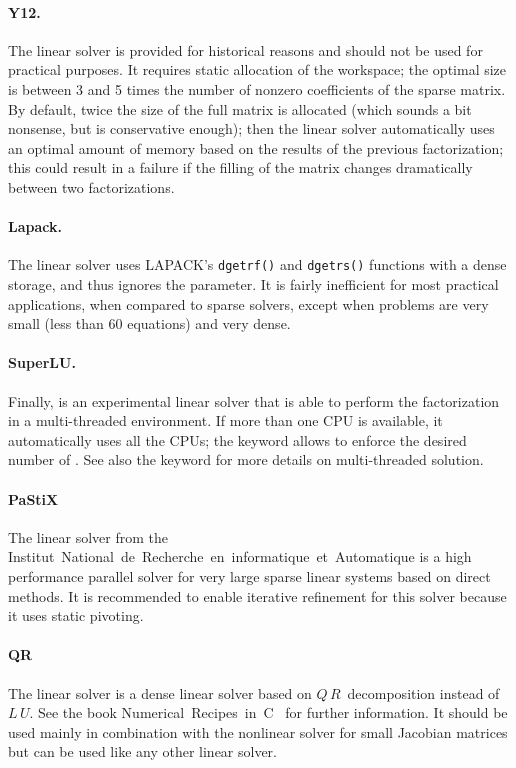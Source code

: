 \paragraph{Y12.}
The  linear solver is provided for historical reasons
and should not be used for practical purposes.
It requires static allocation of the workspace;
the optimal size  is between 3 and 5 times
the number of nonzero coefficients of the sparse matrix.
By default, twice the size of the full matrix is allocated
(which sounds a bit nonsense, but is conservative enough);
then the linear solver automatically uses an optimal amount of memory
based on the results of the previous factorization; this could
result in a failure if the filling of the matrix changes 
dramatically between two factorizations.

\paragraph{Lapack.}
The  linear solver uses LAPACK's \texttt{dgetrf()}
and \texttt{dgetrs()} functions with a dense storage,
and thus ignores the  parameter.
It is fairly inefficient for most practical applications,
when compared to sparse solvers, except when problems are very small
(less than 60 equations) and very dense.

\paragraph{SuperLU.}
Finally,  is an experimental linear solver that is able to perform
the factorization in a multi-threaded environment.
If more than one CPU is available, it automatically uses all the CPUs;
the keyword  allows to enforce the desired number of .
See also the  keyword for more details on multi-threaded
solution.

\paragraph{PaStiX}
The  linear solver from the Institut~National~de~Recherche~en~informatique~et~Automatique
is a high performance parallel solver for very large sparse linear systems based on direct methods.
It is recommended to enable iterative refinement for this solver because it uses static pivoting.

\paragraph{QR}
The  linear solver is a dense linear solver based on $Q\,R$~decomposition instead of $L\,U$.
See the book Numerical~Recipes~in~{C}~\cite{NUMERICAL-RECIPES-IN-C} for further information.
It should be used mainly in combination with the  nonlinear solver for small Jacobian
matrices but can be used like any other linear solver.

